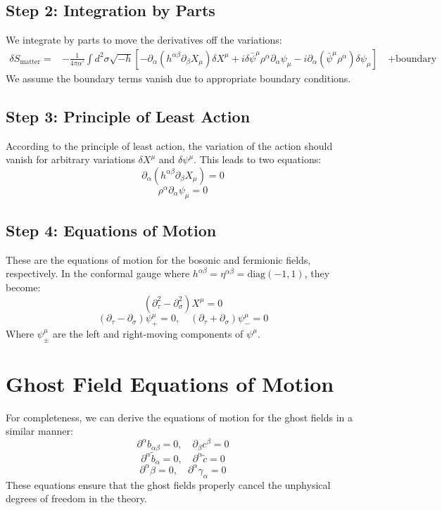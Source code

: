 \documentclass{article}
\begin{document}
\subsection{Step 2: Integration by Parts}
We integrate by parts to move the derivatives off the variations:
\begin{align}
\delta S_{\text{matter}} = &-\frac{1}{4\pi\alpha'} \int d^2\sigma \sqrt{-h} \left[ -\partial_\alpha(h^{\alpha\beta} \partial_\beta X_\mu) \delta X^\mu + i \delta\bar{\psi}^\mu \rho^\alpha \partial_\alpha \psi_\mu - i \partial_\alpha(\bar{\psi}^\mu \rho^\alpha) \delta\psi_\mu \right] \nonumber \
&+ \text{boundary terms}
\end{align}
We assume the boundary terms vanish due to appropriate boundary conditions.
\subsection{Step 3: Principle of Least Action}
According to the principle of least action, the variation of the action should vanish for arbitrary variations $\delta X^\mu$ and $\delta\psi^\mu$. This leads to two equations:
\begin{equation}
\partial_\alpha(h^{\alpha\beta} \partial_\beta X_\mu) = 0
\end{equation}
\begin{equation}
\rho^\alpha \partial_\alpha \psi_\mu = 0
\end{equation}
\subsection{Step 4: Equations of Motion}
These are the equations of motion for the bosonic and fermionic fields, respectively. In the conformal gauge where $h^{\alpha\beta} = \eta^{\alpha\beta} = \text{diag}(-1,1)$, they become:
\begin{equation}
(\partial_\tau^2 - \partial_\sigma^2) X^\mu = 0
\end{equation}
\begin{equation}
(\partial_\tau - \partial_\sigma) \psi_+^\mu = 0, \quad (\partial_\tau + \partial_\sigma) \psi_-^\mu = 0
\end{equation}
Where $\psi_\pm^\mu$ are the left and right-moving components of $\psi^\mu$.
\section{Ghost Field Equations of Motion}
For completeness, we can derive the equations of motion for the ghost fields in a similar manner:
\begin{equation}
\partial^\alpha b_{\alpha\beta} = 0, \quad \partial_\beta c^\beta = 0
\end{equation}
\begin{equation}
\partial^\alpha \tilde{b}_\alpha = 0, \quad \partial^\alpha \tilde{c} = 0
\end{equation}
\begin{equation}
\partial^\alpha \beta = 0, \quad \partial^\alpha \gamma_\alpha = 0
\end{equation}
These equations ensure that the ghost fields properly cancel the unphysical degrees of freedom in the theory.
\end{document}
